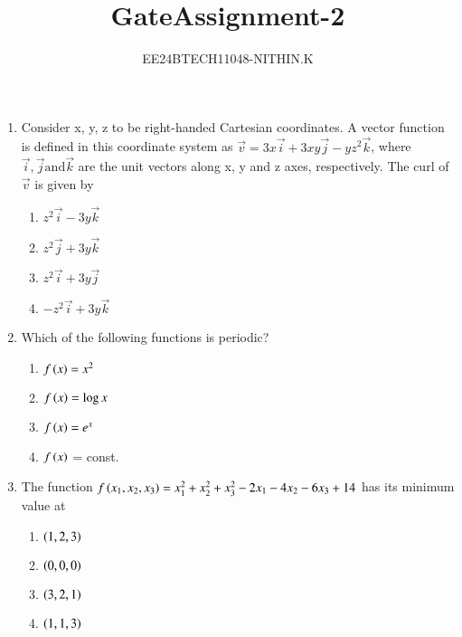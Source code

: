 \documentclass[journal]{IEEEtran}
\numberwithin{equation}{enumi}
\numberwithin{figure}{enumi}
\begin{document}


\title{GateAssignment-2}
\author{EE24BTECH11048-NITHIN.K} 
{\let\newpage\relax\maketitle}

\begin{enumerate}
\section{Q.1-Q.25 carry one mark each}
\item Consider x, y, z to be right-handed Cartesian coordinates. A vector function is defined in this coordinate system as $\vec{v} = 3x\vec{i} + 3xy\vec{j} - yz^2\vec{k}$, where $\vec{i}, \vec{j} \text{and} \vec{k}$ are the unit vectors along x, y and z axes, respectively. The curl of $\vec{v}$ is given by
	\begin{enumerate}
		\item $z^2\vec{i} - 3y\vec{k}$
		\item $z^2\vec{j} + 3y\vec{k}$
		\item $z^2\vec{i} + 3y\vec{j}$
		\item $-z^2\vec{i} + 3y\vec{k}$
	\end{enumerate}
\item Which of the following functions is periodic?
	\begin{enumerate}
		\item $f\left(x\right) = x^2$
		\item $f\left(x\right) = \log{x}$
		\item $f\left(x\right) = e^x$ 
		\item $f\left(x\right)$ = const.
	\end{enumerate}
\item The function $f\left(x_1, x_2, x_3\right) = x_1^2 + x_2^2 + x_3^2 - 2x_1 - 4x_2 - 6x_3 + 14$ has its minimum value at
	\begin{enumerate} 
		\item $\left(1,2,3\right)$
		\item $\left(0,0,0\right)$
		\item $\left(3,2,1\right)$       
		\item $\left(1,1,3\right)$     
	\end{enumerate}

\end{enumerate}
\end{document}
